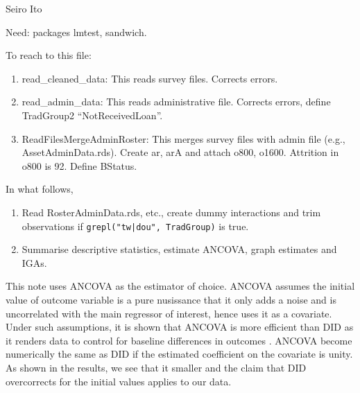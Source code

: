 \hfil Seiro Ito

\setcounter{tocdepth}{3}
\tableofcontents
\newpage

\setlength{\parindent}{1em}
\vspace{2ex}

Need: packages \textsf{lmtest, sandwich}.


To reach to this file:
\begin{enumerate}
\vspace{1.0ex}\setlength{\itemsep}{1.0ex}\setlength{\baselineskip}{12pt}
\item	read\_cleaned\_data: This reads survey files. Corrects errors.
\item	read\_admin\_data: This reads administrative file. Corrects errors, define \textsf{TradGroup2}  ``NotReceivedLoan''.
\item	ReadFilesMergeAdminRoster: This merges survey files with admin file (e.g., \textsf{AssetAdminData.rds}). Create \textsf{ar, arA} and attach \textsf{o800, o1600}. Attrition in \textsf{o800} is 92. Define \textsf{BStatus}.
\end{enumerate}

In what follows, 
\begin{enumerate}
\vspace{1.0ex}\setlength{\itemsep}{1.0ex}\setlength{\baselineskip}{12pt}
\item	Read RosterAdminData.rds, etc., create dummy interactions and trim observations if \verb+grepl("tw|dou", TradGroup)+ is true. 
\item	Summarise descriptive statistics, estimate ANCOVA, graph estimates and IGAs.
\end{enumerate}









	This note uses ANCOVA as the estimator of choice. ANCOVA assumes the initial value of outcome variable is a pure nusissance that it only adds a noise and is uncorrelated with the main regressor of interest, hence uses it as a covariate. Under such assumptions, it is shown that ANCOVA is more efficient than DID as it renders data to control for baseline differences in outcomes \citep{FrisonPocock1992}. ANCOVA become numerically the same as DID if the estimated coefficient on the covariate is unity. As shown in the results, we see that it smaller and the claim that DID overcorrects for the initial values applies to our data.


